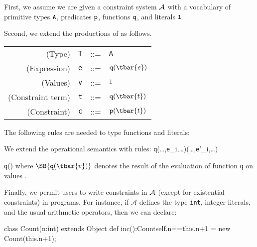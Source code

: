 First, we assume we are given a constraint system $\cal A$ with a vocabulary of primitive types ${\tt A}$,
predicates ${\tt p}$, functions ${\tt q}$, and literals ${\tt l}$.

Second, we extend the productions of \FXZ{} as follows.
\begin{center}
\begin{tabular}{r@{\quad}rcl}
  (Type)& {\tt T} &{::=}& {\tt A} \\
  (Expression) & {\tt e} &{::=}& ${\tt q}(\tbar{e})$ \\
  (Values) & {\tt v} &{::=}& ${\tt l}$ \\
  (Constraint term) & {\tt t} &{::=}& ${\tt q}(\tbar{t})$ \\
  (Constraint) & {\tt c} &{::=}& ${\tt p}(\tbar{t})$ \\  
\end{tabular}
\end{center}

The following rules are needed to type functions and literals:

	{\Gamma{}}

	{\Gamma{}}

We extend the operational semantics with rules:
	{{\tt q}(\ldots,{\tt e}_i,\ldots)(\ldots,{\tt e}'_i,\ldots)}

	{{\tt q}()\derives {}}
where $\SB{{\tt q}(\tbar{v})}$ denotes the result of the evaluation of function {\tt q} on values .

Finally, we permit users to write constraints in $\cal A$ (except for existential constraints) in programs.
%
For instance, if $\mathcal{A}$ defines the type {\tt int}, integer literals, and the usual arithmetic operators, then we can declare:

\begin{xten}
class Count(n:int) extends Object {
  def inc():Count{self.n==this.n+1} =
  	new Count(this.n+1);
}
\end{xten}

